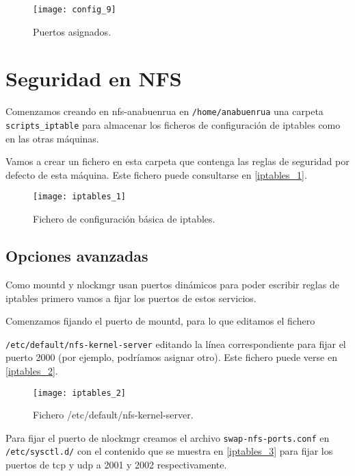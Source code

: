 \begin{figure}[h!]
\begin{center}
\caption{Puertos asignados.}
\label{config_10}
\texttt{[image: config\_9]}
\end{center}
\end{figure}

\chapter{Seguridad en NFS}

Comenzamos creando en nfs-anabuenrua en \verb|/home/anabuenrua| una carpeta \verb|scripts_iptable| para almacenar los ficheros de configuración de iptables como en las otras máquinas.

Vamos a crear un fichero en esta carpeta que contenga las reglas de seguridad por defecto de esta máquina. Este fichero puede consultarse en \eqref{iptables_1}.

\begin{figure}[h!]
\begin{center}
\caption{Fichero de configuración básica de iptables.}
\label{iptables_1}
\texttt{[image: iptables\_1]}
\end{center}
\end{figure}

\section{Opciones avanzadas}

Como mountd y nlockmgr usan puertos dinámicos para poder escribir reglas de iptables primero vamos a fijar los puertos de estos servicios.

Comenzamos fijando el puerto de mountd, para lo que editamos el fichero 

\verb|/etc/default/nfs-kernel-server| editando la línea correspondiente para fijar el puerto 2000 (por ejemplo, podríamos asignar otro). Este fichero puede verse en \eqref{iptables_2}.

\begin{figure}[h!]
\begin{center}
\caption{Fichero /etc/default/nfs-kernel-server.}
\label{iptables_2}
\texttt{[image: iptables\_2]}
\end{center}
\end{figure}

Para fijar el puerto de nlockmgr creamos el archivo \verb|swap-nfs-ports.conf| en \verb|/etc/sysctl.d/| con el contenido que se muestra en \eqref{iptables_3} para fijar los puertos de tcp y udp a 2001 y 2002 respectivamente.


